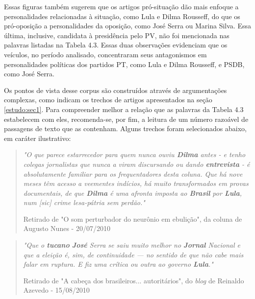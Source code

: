 Essas figuras também sugerem que os artigos pró-situação dão mais enfoque a personalidades relacionadas à situação, como Lula e Dilma Rousseff, do que os pró-oposição a personalidades da oposição, como José Serra ou Marina Silva. Essa última, inclusive, candidata à presidência pelo PV, não foi mencionada nas palavras listadas na Tabela 4.3. Essas duas observações evidenciam que os veículos, no período analisado, concentraram seus antagonismos em personalidades políticas dos partidos PT, como Lula e Dilma Rousseff, e PSDB, como José Serra.


Os pontos de vista desse corpus são construídos através de argumentações complexas, como indicam os trechos de artigos apresentados na seção \ref{estudo:sec1}. Para compreender melhor a relação que as palavras da Tabela 4.3 estabelecem com eles, recomenda-se, por fim, a leitura de um número razoável de passagens de texto que as contenham. Alguns trechos foram selecionados abaixo, em caráter ilustrativo:

\begin{quote}
\emph{"O que parece estarrecedor para quem nunca ouviu \textbf{Dilma} antes - e tenho colegas jornalistas que nunca a viram discursando ou dando \textbf{entrevista} - é absolutamente familiar para os frequentadores desta coluna. Que há nove meses têm acesso a veementes indícios, há muito transformados em provas documentais, de que \textbf{Dilma} é uma afronta imposta ao \textbf{Brasil} por \textbf{Lula}, num [sic] crime lesa-pátria sem perdão."}

{\small Retirado de "O som perturbador do neurônio em ebulição", da coluna de Augusto Nunes - 20/07/2010}
\end{quote}

\begin{quote}
\emph{"Que o \textbf{tucano} \textbf{José} Serra se saiu muito melhor no \textbf{Jornal} Nacional e que a eleição é, sim, de continuidade — no sentido de que não cabe mais falar em ruptura. E fiz uma crítica ou outra ao governo \textbf{Lula}."}

{\small Retirado de "A cabeça dos brasileiros... autoritários", do \emph{blog} de Reinaldo Azevedo - 15/08/2010}
\end{quote}

